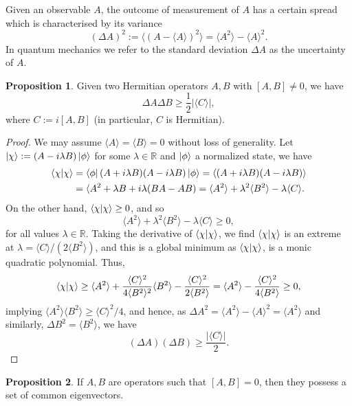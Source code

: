 \documentclass[]{article}
\theoremstyle{definition}
\theoremstyle{definition}
\newtheorem{proposition}{Proposition}[section]
\begin{document}
Given an observable \(A\), the outcome of measurement of \(A\) has a certain 
spread which is characterised by its variance 
\[(\Delta A)^2 := \langle (A - \langle A \rangle)^2 \rangle
  = \langle A^2 \rangle - \langle A \rangle^2.\]
In quantum mechanics we refer to the standard deviation \(\Delta A\) as the 
uncertainty of \(A\).

\begin{proposition}
  Given two Hermitian operators \(A, B\) with \([A, B] \neq 0\), we have 
  \[\Delta A \Delta B \ge \frac{1}{2} |\langle C \rangle|,\]
  where \(C := i [A, B]\) (in particular, \(C\) is Hermitian).
\end{proposition}
\begin{proof}
  We may assume \(\langle A \rangle = \langle B \rangle = 0\) without loss 
  of generality. Let \(\ket{\chi} := (A - i \lambda B) \ket{\phi}\) for some 
  \(\lambda \in \mathbb{R}\) and \(\ket{\phi}\) a normalized state, we have 
  \[\begin{split}
    \bra{\chi}\ket{\chi} & = 
        \bra{\phi}(A + i \lambda B)(A - i \lambda B)\ket{\phi}
      = \langle (A + i \lambda B)(A - i \lambda B) \rangle \\
    & = \langle A^2 + \lambda B + i \lambda(BA -  AB)
      = \langle A^2 \rangle + \lambda^2 \langle B^2 \rangle - 
        \lambda \langle C \rangle. 
  \end{split}\]
  On the other hand, \(\bra{\chi}\ket{\chi} \ge 0\), and so 
  \[\langle A^2 \rangle + \lambda^2 \langle B^2 \rangle - 
  \lambda \langle C \rangle \ge 0,\]
  for all values \(\lambda \in \mathbb{R}\). Taking the derivative of 
  \(\bra{\chi}\ket{\chi}\), we find \(\bra{\chi}\ket{\chi}\) is an extreme 
  at \(\lambda = \langle C \rangle / (2 \langle B^2 \rangle)\), and this is 
  a global minimum as \(\bra{\chi}\ket{\chi}\), is a monic quadratic polynomial.
  Thus, 
  \[\bra{\chi}\ket{\chi} \ge \langle A^2 \rangle + 
  \frac{\langle C \rangle^2}{4\langle B^2 \rangle^2} \langle B^2 \rangle - 
  \frac{\langle C \rangle^2}{2\langle B^2 \rangle} = 
  \langle A^2 \rangle - \frac{\langle C \rangle^2}{4\langle B^2 \rangle} \ge 0,\]
  implying \(\langle A^2 \rangle \langle B^2 \rangle \ge \langle C \rangle^2 / 4\), 
  and hence, as \(\Delta A^2 = \langle A^2 \rangle - \langle A \rangle^2 = 
  \langle A^2 \rangle\) and similarly, \(\Delta B^2 = \langle B^2 \rangle\),
  we have
  \[(\Delta A)(\Delta B) \ge \frac{|\langle C \rangle|}{2}.\]
\end{proof}

\begin{proposition}
  If \(A, B\) are operators such that \([A, B] = 0\), then they possess a set 
  of common eigenvectors.
\end{proposition}
\end{document}
